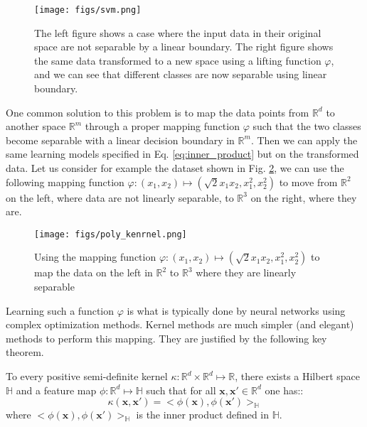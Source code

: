 \begin{figure}[t]
	\centering
	\texttt{[image: figs/svm.png]}
	\caption[The case where classes aren't separable using linear boundary]{The left figure shows a case where the input data in their original space are not separable by a linear boundary. The right figure shows the same data transformed to a new space using a lifting function $\varphi$, and we can see that different classes are now separable  using linear boundary. }
	\label{fig:SVM_boundaries}
\end{figure}

One common solution to this problem is to map the data points from $\mathbb{R}^d$ to another space $\mathbb{R}^m$  through a proper mapping function $\varphi$ such that the two classes become separable with a linear decision boundary in $\mathbb{R}^m$. Then we can apply the same learning models specified in Eq. \ref{eq:inner_product} but on the transformed data. Let us consider for example the dataset shown in Fig. \ref{fig:polynomial_kernel},  we can use the following mapping function $\varphi:(x_1,x_2)\mapsto (\sqrt{2}x_1x_2,x_1^2,x_2^2)$ to move from $\mathbb{R}^2$ on the left, where data are not linearly separable, to $\mathbb{R}^3$ on the right, where they are.

\begin{figure}[t]
\centering
\texttt{[image: figs/poly\_kenrnel.png]}
\caption[Lifting data to a higher-dimension space to get linearly separable classes]{ Using the mapping function $\varphi:(x_1,x_2)\mapsto (\sqrt{2}x_1x_2,x_1^2,x_2^2)$ to map the data on the left in $\mathbb{R}^2$ to $\mathbb{R}^3$ where they are linearly separable}
\label{fig:polynomial_kernel}
\end{figure}

Learning such a function $\varphi$ is what is typically done by neural networks using complex optimization methods.  Kernel methods are much simpler (and elegant) methods to perform this mapping. They are justified by the following key theorem.

\begin{theorem}
To every positive semi-definite kernel $\kappa:\mathbb{R}^d\times \mathbb{R}^d\mapsto \mathbb{R}$, there exists a Hilbert space $\mathbb{H}$ and a feature map $\phi:\mathbb{R}^d\mapsto\mathbb{H}$ such that for all $\mathbf{x},\mathbf{x}'\in\mathbb{R}^d$ one has:: 
\begin{equation}
\label{eq:kernel_main_equation}
    \kappa(\mathbf{x},\mathbf{x}')=<\phi(\mathbf{x}),\phi(\mathbf{x}')>_\mathbb{H}
\end{equation}
where $<\phi(\mathbf{x}),\phi(\mathbf{x}')>_\mathbb{H}$ is the inner product defined in $\mathbb{H}$.
\end{theorem}

